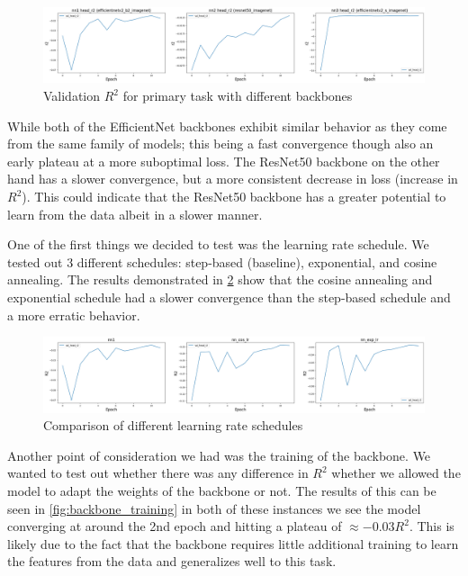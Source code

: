\documentclass[12pt,a4paper,oneside]{article}
\begin{document}
\begin{figure}[!h]
    \centering
    \includegraphics[width=1\textwidth]{assets/different_backbones.png}
    \caption{Validation $R^2$ for primary task with different backbones}
    \label{fig:different_backbones}
\end{figure}

While both of the EfficientNet backbones exhibit similar behavior as they come from the same family of models; this being a fast convergence though also an early plateau at a more suboptimal loss. The ResNet50 backbone on the other hand has a slower convergence, but a more consistent decrease in loss (increase in $R^2$). This could indicate that the ResNet50 backbone has a greater potential to learn from the data albeit in a slower manner. 

\smallskip 
One of the first things we decided to test was the learning rate schedule. We tested out 3 different schedules: step-based (baseline), exponential, and cosine annealing. The results demonstrated in \ref{fig:lr_schedules} show that the cosine annealing and exponential schedule had a slower convergence than the step-based schedule and a more erratic behavior.  

\begin{figure}[!h]
    \centering
    \includegraphics[width=1\textwidth]{assets/lr_schedule_diffs.png}
    \caption{Comparison of different learning rate schedules}
    \label{fig:lr_schedules}
\end{figure}


Another point of consideration we had was the training of the backbone. We wanted to test out whether there was any difference in $R^2$ whether we allowed the model to adapt the weights of the backbone or not. The results of this can be seen in \ref{fig:backbone_training} in both of these instances we see the model converging at around the 2nd epoch and hitting a plateau of $\approx -0.03 R^2$. This is likely due to the fact that the backbone requires little additional training to learn the features from the data and generalizes well to this task.
\end{document}
